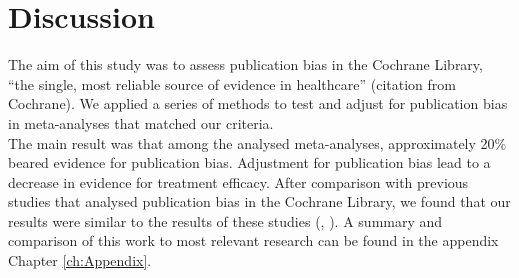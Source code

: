 \documentclass[11pt,a4paper,twoside]{book}\usepackage[]{graphicx}\usepackage[]{color}
\begin{document}





\chapter{Discussion} \label{ch:Discussion}

The aim of this study was to assess publication bias in the Cochrane Library, ``the single, most reliable source of evidence in healthcare'' (citation from Cochrane). We applied a series of methods to test and adjust for publication bias in meta-analyses that matched our criteria. \\
The main result was that among the analysed meta-analyses, approximately 20\% beared evidence for publication bias. Adjustment for publication bias lead to a decrease in evidence for treatment efficacy. After comparison with previous studies that analysed publication bias in the Cochrane Library, we found that our results were similar to the results of these studies (\eg \citealp{Egger}, \citealp{Ioannidis2007}). A summary and comparison of this work to most relevant research can be found in the appendix Chapter \ref{ch:Appendix}.\\
\end{document}
